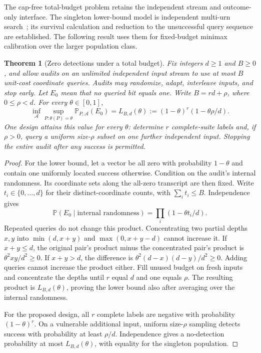 \documentclass[conference]{IEEEtran}
\newtheorem{theorem}{Theorem}
\newcommand{\Prob}{\mathbb{P}}
\begin{document}
The cap-free total-budget problem retains the independent stream and outcome-only interface. The singleton lower-bound model is independent multi-urn search~\cite{marks}; its survival calculation and reduction to the unsuccessful query sequence are established. The following result uses them for fixed-budget minimax calibration over the larger population class.

\begin{theorem}[Zero detections under a total budget]\label{thm:zero-budget}
Fix integers $d\geq1$ and $B\geq0$, and allow audits on an unlimited independent input stream to use at most $B$ unit-cost coordinate queries. Audits may randomize, adapt, interleave inputs, and stop early. Let $E_0$ mean that no queried bit equals one. Write $B=rd+\rho$, where $0\leq \rho<d$. For every $\theta\in[0,1]$,
\begin{equation}\label{eq:zero-minimax}
 \inf_{\mathcal A}\sup_{P:\theta(P)=\theta}
 \Prob_{P,\mathcal A}(E_0)
 =L_{B,d}(\theta):=(1-\theta)^r(1-\theta \rho/d).
\end{equation}
One design attains this value for every $\theta$: determine $r$ complete-suite labels and, if $\rho>0$, query a uniform size-$\rho$ subset on one further independent input. Stopping the entire audit after any success is permitted.
\end{theorem}
\begin{proof}
For the lower bound, let a vector be all zero with probability $1-\theta$ and contain one uniformly located success otherwise. Condition on the audit's internal randomness. Its coordinate sets along the all-zero transcript are then fixed. Write $t_i\in\{0,\ldots,d\}$ for their distinct-coordinate counts, with $\sum_i t_i\leq B$. Independence gives
\[
 \Prob(E_0\mid\text{internal randomness})
 =\prod_i(1-\theta t_i/d).
\]
Repeated queries do not change this product. Concentrating two partial depths $x,y$ into $\min(d,x+y)$ and $\max(0,x+y-d)$ cannot increase it. If $x+y\leq d$, the original pair's product minus the concentrated pair's product is $\theta^2xy/d^2\geq0$. If $x+y>d$, the difference is $\theta^2(d-x)(d-y)/d^2\geq0$. Adding queries cannot increase the product either. Fill unused budget on fresh inputs and concentrate the depths until $r$ equal $d$ and one equals $\rho$. The resulting product is $L_{B,d}(\theta)$, proving the lower bound also after averaging over the internal randomness.

For the proposed design, all $r$ complete labels are negative with probability $(1-\theta)^r$. On a vulnerable additional input, uniform size-$\rho$ sampling detects success with probability at least $\rho/d$. Independence gives a no-detection probability at most $L_{B,d}(\theta)$, with equality for the singleton population.
\end{proof}
\end{document}
